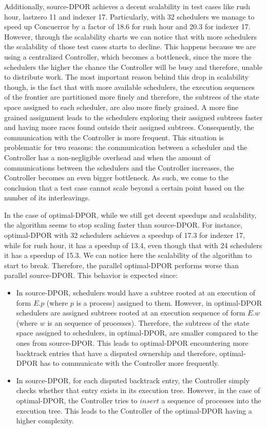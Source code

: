 Additionally, source-DPOR achieves a decent scalability in test cases like rush hour, lastzero 11 and indexer 17. Particularly, with
32 schedulers we manage to speed up Concuerror by a factor of 18.6 for rush hour and 20.3 for indexer 17. However, through the scalability charts 
we can notice that with more schedulers the scalability of those test cases starts to decline. This happens because we
are using a centralized Controller, which becomes a bottleneck, since the more the schedulers the
higher the chance the Controller will be busy and therefore, unable to distribute work. The most important reason 
behind this drop in scalability though, is the fact that with more available schedulers, the execution sequences of the frontier are partitioned more finely and therefore, the subtrees of the state space assigned to each scheduler, are also more finely grained. A more fine grained assignment leads to the schedulers exploring their
assigned subtrees faster and having more races found outside their assigned subtrees.
Consequently, the communication with the Controller is more frequent. This situation is problematic for two reasons:
the communication between a scheduler and the Controller has a non-negligible overhead and when the amount of 
communications between the schedulers and the Controller increases, the Controller becomes an even bigger bottleneck.
As such, we come to the conclusion that a test case cannot scale beyond a certain point based on the number of its interleavings.

In the case of optimal-DPOR, while we still get decent speedups and scalability, the algorithm seems to stop scaling faster than source-DPOR. For instance, optimal-DPOR with 32 schedulers achieves a speedup of 17.3 for indexer 17, while for rush hour, it has a speedup of 13.4, even though that with 24 schedulers it has a speedup of 15.3. We can notice here the scalability of the algorithm to start to break. Therefore, the parallel optimal-DPOR performs worse than parallel source-DPOR. This behavior is expected since:

\begin{itemize}

\item In source-DPOR, schedulers would have a subtree rooted at an execution of form $E.p$ (where $p$ is a process) assigned to them. However, in optimal-DPOR schedulers are assigned subtrees rooted at an execution sequence of form $E.w$ (where $w$ is an sequence of processes). Therefore, the subtrees of the state space assigned to schedulers, in optimal-DPOR, are smaller compared to the ones from source-DPOR. This leads to optimal-DPOR encountering more backtrack entries that have a disputed ownership and therefore, optimal-DPOR has to communicate with the Controller more frequently.
\item In source-DPOR, for each disputed backtrack entry, the Controller simply checks whether that entry exists in its execution tree. However, in the case of optimal-DPOR, the Controller tries to $insert$ a sequence of processes into the execution tree. This leads to the Controller of the optimal-DPOR having a higher complexity.

\end{itemize}

